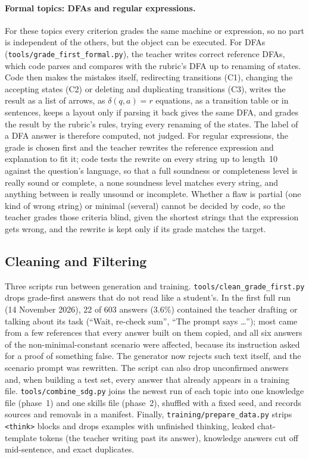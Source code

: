 \documentclass[11pt,a4paper]{article}
\newcommand{\file}[1]{\nolinkurl{#1}}
\newcommand{\lvl}[1]{\textsf{#1}}
\theoremstyle{definition}
\begin{document}
\paragraph{Formal topics: DFAs and regular expressions.}
For these topics every criterion grades the same machine or expression, so no part is independent of the others, but the object can be executed. For DFAs (\file{tools/grade_first_formal.py}), the teacher writes correct reference DFAs, which code parses and compares with the rubric's DFA up to renaming of states. Code then makes the mistakes itself, redirecting transitions (C1), changing the accepting states (C2) or deleting and duplicating transitions (C3), writes the result as a list of arrows, as $\delta(q,a)=r$ equations, as a transition table or in sentences, keeps a layout only if parsing it back gives the same DFA, and grades the result by the rubric's rules, trying every renaming of the states. The label of a DFA answer is therefore computed, not judged. For regular expressions, the grade is chosen first and the teacher rewrites the reference expression and explanation to fit it; code tests the rewrite on every string up to length~10 against the question's language, so that a \lvl{full} soundness or completeness level is really sound or complete, a \lvl{none} soundness level matches every string, and anything between is really unsound or incomplete. Whether a flaw is \lvl{partial} (one kind of wrong string) or \lvl{minimal} (several) cannot be decided by code, so the teacher grades those criteria blind, given the shortest strings that the expression gets wrong, and the rewrite is kept only if its grade matches the target.

\subsection{Cleaning and Filtering}\label{sec:filtering}
Three scripts run between generation and training. \file{tools/clean_grade_first.py} drops grade-first answers that do not read like a student's. In the first full run (14 November 2026), 22 of 603 answers (3.6\%) contained the teacher drafting or talking about its task (``Wait, re-check sum'', ``The prompt says \ldots''); most came from a few references that every answer built on them copied, and all six answers of the non-minimal-constant scenario were affected, because its instruction asked for a proof of something false. The generator now rejects such text itself, and the scenario prompt was rewritten. The script can also drop unconfirmed answers and, when building a test set, every answer that already appears in a training file. \file{tools/combine_sdg.py} joins the newest run of each topic into one knowledge file (phase~1) and one skills file (phase~2), shuffled with a fixed seed, and records sources and removals in a manifest. Finally, \file{training/prepare_data.py} strips \texttt{<think>} blocks and drops examples with unfinished thinking, leaked chat-template tokens (the teacher writing past its answer), knowledge answers cut off mid-sentence, and exact duplicates.
\end{document}
